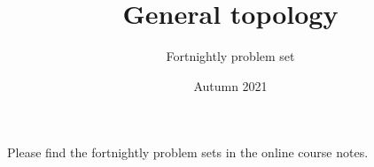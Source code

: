 \documentclass[a4paper,twoside,nols,nobib]{tufte-handout}
\title{General topology}
\author{Fortnightly problem set}
\date{Autumn 2021}
\begin{document}
\maketitle

Please find the fortnightly problem sets in the online course notes.


\end{document}
